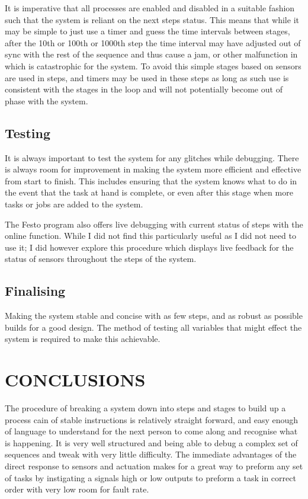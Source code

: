 \documentclass[a4paper, 10pt,  conference]{article}
\begin{document}
It is imperative that all processes are enabled and disabled in a suitable fashion such that the system is reliant on the next steps status. This means that while it may be simple to just use a timer and guess the time intervals between stages, after the 10th or 100th or 1000th step the time interval may have adjusted out of sync with the rest of the sequence and thus cause a jam, or other malfunction in which is catastrophic for the system. To avoid this simple stages based on sensors are used in steps, and timers may be used in these steps as long as such use is consistent with the stages in the loop and will not potentially become out of phase with the system.


\subsection{Testing}
It is always important to test the system for any glitches while debugging. There is always room for improvement in making the system more efficient and effective from start to finish. This includes ensuring that the system knows what to do in the event that the task at hand is complete, or even after this stage when more tasks or jobs are added to the system.

The Festo program also offers live debugging with current status of steps with the online function. While I did not find this particularly useful as I did not need to use it; I did however explore this procedure which displays live feedback for the status of sensors throughout the steps of the system.



\subsection{Finalising}
Making the system stable and concise with as few steps, and as robust as possible builds for a good design. The method of testing all variables that might effect the system is required to make this achievable. 




\section{CONCLUSIONS}
The procedure of breaking a system down into steps and stages to build up a process cain of stable instructions is relatively straight forward, and easy enough of language to understand for the next person to come along and recognise what is happening. It is very well structured and being able to debug a complex set of sequences and tweak with very little difficulty. The immediate advantages of the direct response to sensors and actuation makes for a great way to preform any set of tasks by instigating a signals high or low outputs to preform a task in correct order with very low room for fault rate.
\end{document}
